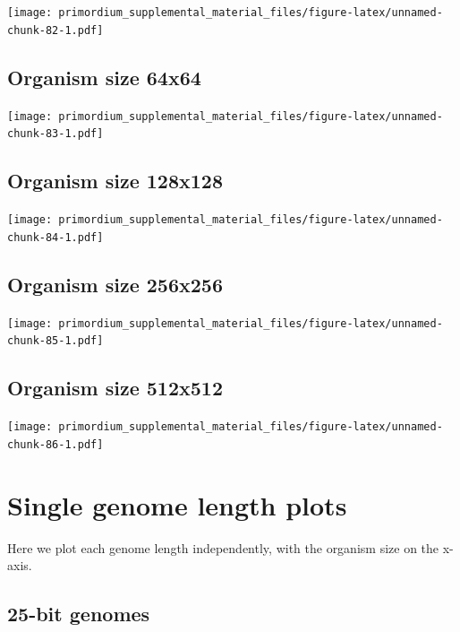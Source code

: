 \documentclass[]{book}
\begin{document}
\texttt{[image: primordium\_supplemental\_material\_files/figure-latex/unnamed-chunk-82-1.pdf]}

\hypertarget{organism-size-64x64-2}{%
\subsection{Organism size 64x64}\label{organism-size-64x64-2}}

\texttt{[image: primordium\_supplemental\_material\_files/figure-latex/unnamed-chunk-83-1.pdf]}

\hypertarget{organism-size-128x128-2}{%
\subsection{Organism size 128x128}\label{organism-size-128x128-2}}

\texttt{[image: primordium\_supplemental\_material\_files/figure-latex/unnamed-chunk-84-1.pdf]}

\hypertarget{organism-size-256x256-2}{%
\subsection{Organism size 256x256}\label{organism-size-256x256-2}}

\texttt{[image: primordium\_supplemental\_material\_files/figure-latex/unnamed-chunk-85-1.pdf]}

\hypertarget{organism-size-512x512-2}{%
\subsection{Organism size 512x512}\label{organism-size-512x512-2}}

\texttt{[image: primordium\_supplemental\_material\_files/figure-latex/unnamed-chunk-86-1.pdf]}

\hypertarget{single-genome-length-plots}{%
\section{Single genome length plots}\label{single-genome-length-plots}}

Here we plot each genome length independently, with the organism size on the x-axis.

\hypertarget{bit-genomes}{%
\subsection{25-bit genomes}\label{bit-genomes}}
\end{document}
